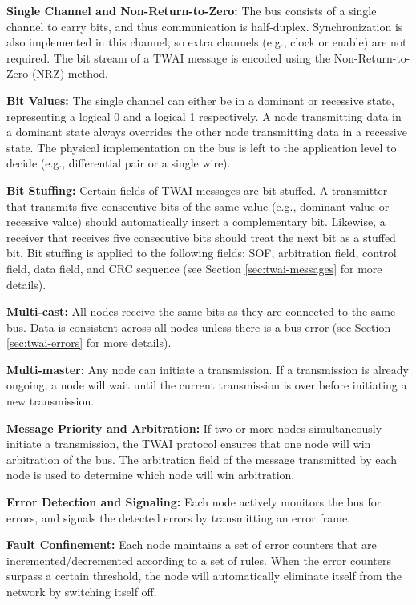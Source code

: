 \documentclass[main\_\_EN.tex]{subfiles}
\begin{document}
{\bfseries Single Channel and Non-Return-to-Zero:} The bus consists of a single channel to carry bits, and thus communication is half-duplex. Synchronization is also implemented in this channel, so extra channels (e.g., clock or enable) are not required. The bit stream of a TWAI message is encoded using the Non-Return-to-Zero (NRZ) method.

{\bfseries Bit Values:} The single channel can either be in a dominant or recessive state, representing a logical 0 and a logical 1 respectively. A node transmitting data in a dominant state always overrides the other node transmitting data in a recessive state. The physical implementation on the bus is left to the application level to decide (e.g., differential pair or a single wire).

{\bfseries Bit Stuffing:} Certain fields of TWAI messages are bit-stuffed. A transmitter that transmits five consecutive bits of the same value (e.g., dominant value or recessive value) should automatically insert a complementary bit. Likewise, a receiver that receives five consecutive bits should treat the next bit as a stuffed bit. Bit stuffing is applied to the following fields: SOF, arbitration field, control field, data field, and CRC sequence (see Section \ref{sec:twai-messages} for more details).

{\bfseries Multi-cast:} All nodes receive the same bits as they are connected to the same bus. Data is consistent across all nodes unless there is a bus error (see Section \ref{sec:twai-errors} for more details).

{\bfseries Multi-master:} Any node can initiate a transmission. If a transmission is already ongoing, a node will wait until the current transmission is over before initiating a new transmission.

{\bfseries Message Priority and Arbitration:} If two or more nodes simultaneously initiate a transmission, the TWAI protocol ensures that one node will win arbitration of the bus. The arbitration field of the message transmitted by each node is used to determine which node will win arbitration.

{\bfseries Error Detection and Signaling: } Each node actively monitors the bus for errors, and signals the detected errors by transmitting an error frame.

{\bfseries Fault Confinement:} Each node maintains a set of error counters that are incremented/decremented according to a set of rules. When the error counters surpass a certain threshold, the node will automatically eliminate itself from the network by switching itself off.
\end{document}
